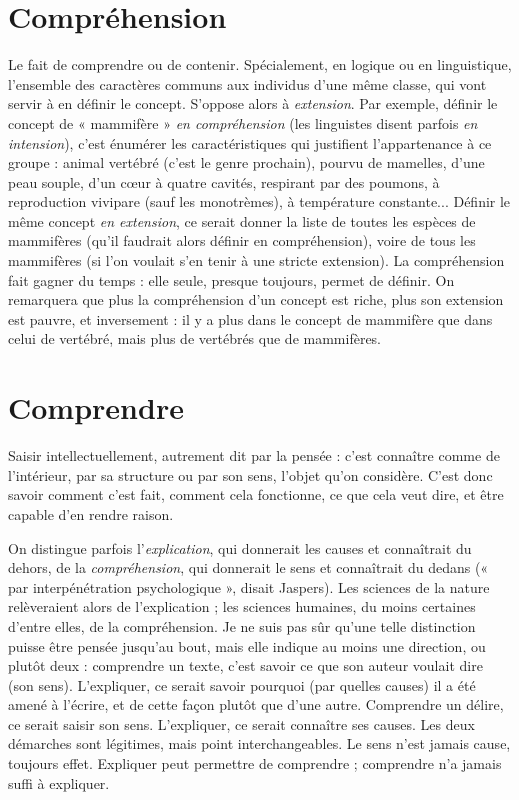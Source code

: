 \section{Compréhension}
Le fait de comprendre ou de contenir. Spécialement,
en logique ou en linguistique, l’ensemble des caractères
communs aux individus d’une même classe, qui vont servir à en définir le
concept. S’oppose alors à {\it extension}. Par exemple, définir le concept de
« mammifère » {\it en compréhension} (les linguistes disent parfois {\it en intension}), c’est
énumérer les caractéristiques qui justifient l’appartenance à ce groupe : animal
vertébré (c’est le genre prochain), pourvu de mamelles, d’une peau souple, d’un
cœur à quatre cavités, respirant par des poumons, à reproduction vivipare (sauf
les monotrèmes), à température constante... Définir le même concept {\it en extension},
ce serait donner la liste de toutes les espèces de mammifères (qu’il faudrait
alors définir en compréhension), voire de tous les mammifères (si l’on voulait
s’en tenir à une stricte extension). La compréhension fait gagner du temps : elle
seule, presque toujours, permet de définir.
On remarquera que plus la compréhension d’un concept est riche, plus son
extension est pauvre, et inversement : il y a plus dans le concept de mammifère
que dans celui de vertébré, mais plus de vertébrés que de mammifères.

\section{Comprendre}
Saisir intellectuellement, autrement dit par la pensée :
c’est connaître comme de l’intérieur, par sa structure ou
par son sens, l’objet qu’on considère. C’est donc savoir comment c’est fait,
comment cela fonctionne, ce que cela veut dire, et être capable d’en rendre
raison.

On distingue parfois l'{\it explication}, qui donnerait les causes et connaîtrait du
dehors, de la {\it compréhension}, qui donnerait le sens et connaîtrait du dedans
(« par interpénétration psychologique », disait Jaspers). Les sciences de la
nature relèveraient alors de l’explication ; les sciences humaines, du moins certaines
d’entre elles, de la compréhension. Je ne suis pas sûr qu’une telle distinction
puisse être pensée jusqu’au bout, mais elle indique au moins une direction,
ou plutôt deux : comprendre un texte, c’est savoir ce que son auteur voulait
dire (son sens). L’expliquer, ce serait savoir pourquoi (par quelles causes) il a été
amené à l'écrire, et de cette façon plutôt que d’une autre. Comprendre un
délire, ce serait saisir son sens. L’expliquer, ce serait connaître ses causes. Les
deux démarches sont légitimes, mais point interchangeables. Le sens n’est
jamais cause, toujours effet. Expliquer peut permettre de comprendre ; comprendre
n’a jamais suffi à expliquer.

